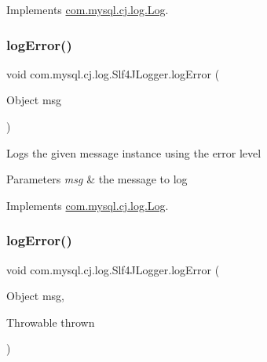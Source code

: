 Implements \mbox{\hyperlink{interfacecom_1_1mysql_1_1cj_1_1log_1_1_log_a42c9900bc643b771d7e337686ac4f799}{com.\+mysql.\+cj.\+log.\+Log}}.

\mbox{\label{classcom_1_1mysql_1_1cj_1_1log_1_1_slf4_j_logger_a1a99e9a4f586e0678a68d1145cd26bc5}} 
\subsubsection{\texorpdfstring{log\+Error()}{logError()}\hspace{0.1cm}{\footnotesize\ttfamily [1/2]}}
{\footnotesize\ttfamily void com.\+mysql.\+cj.\+log.\+Slf4\+J\+Logger.\+log\+Error (\begin{DoxyParamCaption}\item[{Object}]{msg }\end{DoxyParamCaption})}

Logs the given message instance using the \textquotesingle{}error\textquotesingle{} level


\begin{DoxyParams}{Parameters}
{\em msg} & the message to log \\
\hline
\end{DoxyParams}


Implements \mbox{\hyperlink{interfacecom_1_1mysql_1_1cj_1_1log_1_1_log_ab6f35d1efab89f0c0316106fa4a15d2c}{com.\+mysql.\+cj.\+log.\+Log}}.

\mbox{\label{classcom_1_1mysql_1_1cj_1_1log_1_1_slf4_j_logger_a30a623739677aa264670ff888fff2958}} 
\subsubsection{\texorpdfstring{log\+Error()}{logError()}\hspace{0.1cm}{\footnotesize\ttfamily [2/2]}}
{\footnotesize\ttfamily void com.\+mysql.\+cj.\+log.\+Slf4\+J\+Logger.\+log\+Error (\begin{DoxyParamCaption}\item[{Object}]{msg,  }\item[{Throwable}]{thrown }\end{DoxyParamCaption})}

